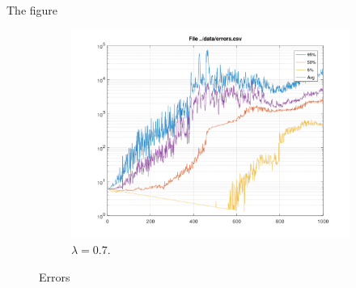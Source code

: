 \documentclass[a4paper,11pt]{article}
\begin{document}
The figure {}
\begin{figure}[h!]
	\centering
	\begin{subfigure}[b]{0.4\linewidth}
		\includegraphics[width=\linewidth]{errors-07.png}
		\caption{$\lambda=0.7$.}
	\end{subfigure}
	\caption{Errors}
	\label{fig:errors}
\end{figure}
\end{document}
